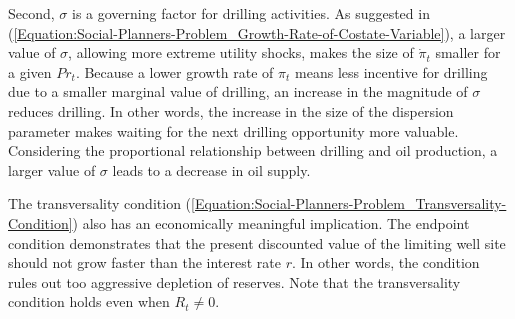 Second, $\sigma$ is a governing factor for drilling activities. As suggested in (\ref{Equation:Social-Planners-Problem_Growth-Rate-of-Costate-Variable}), a larger value of $\sigma$, allowing more extreme utility shocks, makes the size of $\dot{\pi}_{t}$ smaller for a given $Pr_{t}$. Because a lower growth rate of $\pi_{t}$ means less incentive for drilling due to a smaller marginal value of drilling, an increase in the magnitude of $\sigma$ reduces drilling. In other words, the increase in the size of the dispersion parameter makes waiting for the next drilling opportunity more valuable. Considering the proportional relationship between drilling and oil production, a larger value of $\sigma$ leads to a decrease in oil supply. 

The transversality condition (\ref{Equation:Social-Planners-Problem_Transversality-Condition}) also has an economically meaningful implication. The endpoint condition demonstrates that the present discounted value of the limiting well site should not grow faster than the interest rate $r$. In other words, the condition rules out too aggressive depletion of reserves. Note that the transversality condition holds even when $R_{t} \neq 0$.
